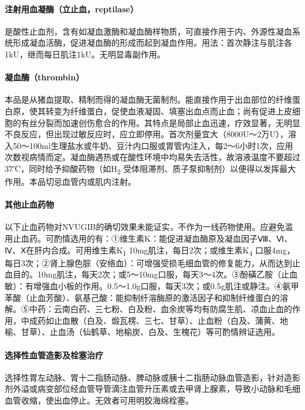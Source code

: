 \paragraph{注射用血凝酶（立止血，reptilase）}

是酸性止血剂，含有如凝血激酶和凝血酶样物质，可直接作用于内、外源性凝血系统形成凝血活酶，促进凝血酶的形成而起到凝血作用。用法：首次静注与肌注各1kU，继而每日肌注1kU。无明显毒副作用。

\paragraph{凝血酶（thrombin）}

本品是从猪血提取、精制而得的凝血酶无菌制剂。能直接作用于出血部位的纤维蛋白原，使其转变为纤维蛋白，促使血液凝固、填塞出血点而止血；尚有促进上皮细胞的有丝分裂而加速创伤愈合的作用。其特点是局部止血迅速，疗效显著，无明显不良反应，但出现过敏反应时，应立即停用。首次剂量宜大（8000U～2万U），溶入50～100ml生理盐水或牛奶、豆汁内口服或胃管内注入，每2～6小时1次，应用次数视病情而定。凝血酶遇热或在酸性环境中均易失去活性，故溶液温度不要超过37℃，同时给予抑酸药物（如H\textsubscript{2}
受体阻滞剂、质子泵抑制剂）以便得以发挥最大作用。本品切忌血管内或肌内注射。

\paragraph{其他止血药物}

以下止血药物对NVUGIB的确切效果未能证实，不作为一线药物使用。应避免滥用止血药。可酌情选用的有：①维生素K：能促进凝血酶原及凝血因子Ⅷ、Ⅵ、Ⅳ、Ⅹ在肝内合成。可用维生素K\textsubscript{1}
10mg肌注，每日2次；或维生素K\textsubscript{4}
口服4mg，每日3次；②肾上腺色腙（安络血）：可增强受损毛细血管的修复能力，从而达到止血目的。10mg肌注，每天2次；或5～10mg口服，每天3～4次。③酚磺乙胺（止血敏）：有增强血小板的作用。0.5～1.0g口服，每天3次；或0.5g肌注或静注。④氨甲苯酸（止血芳酸）、氨基己酸：能抑制纤溶酶原的激活因子和抑制纤维蛋白的溶解。⑤中药：云南白药、三七粉、白及粉、血余炭等均有防腐生肌、凉血止血的作用，中成药如止血散（白及、煅瓦楞、三七、甘草）、止血粉（白及、蒲黄、地榆、甘草）、止血汤（仙鹤草、地榆炭、白及、生槐花）等可酌情辨证选用。

\paragraph{选择性血管造影及栓塞治疗}

选择性胃左动脉、胃十二指肠动脉、脾动脉或胰十二指肠动脉血管造影，针对造影剂外溢或病变部位经血管导管滴注血管升压素或去甲肾上腺素，导致小动脉和毛细血管收缩，使出血停止。无效者可用明胶海绵栓塞。

